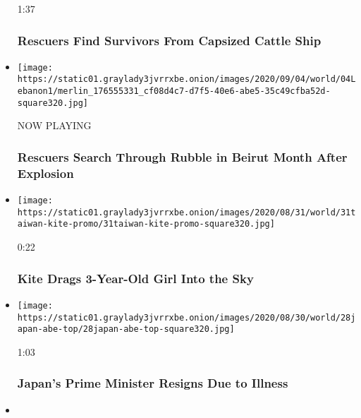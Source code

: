 \begin{itemize}
  1:37

  \hypertarget{rescuers-find-survivors-from-capsized-cattle-ship}{%
  \subsubsection{Rescuers Find Survivors From Capsized Cattle
  Ship}\label{rescuers-find-survivors-from-capsized-cattle-ship}}
\item
  \texttt{[image: https://static01.graylady3jvrrxbe.onion/images/2020/09/04/world/04Lebanon1/merlin\_176555331\_cf08d4c7-d7f5-40e6-abe5-35c49cfba52d-square320.jpg]}

  NOW PLAYING

  \hypertarget{rescuers-search-through-rubble-in-beirut-month-after-explosion-1}{%
  \subsubsection{Rescuers Search Through Rubble in Beirut Month After
  Explosion}\label{rescuers-search-through-rubble-in-beirut-month-after-explosion-1}}
\item
  \href{https://www.nytimes3xbfgragh.onion/video/world/asia/100000007316365/taiwan-kite-video.html?action=click\&module=video-series-bar\&region=header\&pgtype=Article\&playlistId=video/world}{}

  \texttt{[image: https://static01.graylady3jvrrxbe.onion/images/2020/08/31/world/31taiwan-kite-promo/31taiwan-kite-promo-square320.jpg]}

  0:22

  \hypertarget{kite-drags-3-year-old-girl-into-the-sky}{%
  \subsubsection{Kite Drags 3-Year-Old Girl Into the
  Sky}\label{kite-drags-3-year-old-girl-into-the-sky}}
\item
  \href{https://www.nytimes3xbfgragh.onion/video/us/100000007313110/japan-prime-minister-shinzo-abe-resigns-video.html?action=click\&module=video-series-bar\&region=header\&pgtype=Article\&playlistId=video/world}{}

  \texttt{[image: https://static01.graylady3jvrrxbe.onion/images/2020/08/30/world/28japan-abe-top/28japan-abe-top-square320.jpg]}

  1:03

  \hypertarget{japans-prime-minister-resigns-due-to-illness}{%
  \subsubsection{Japan's Prime Minister Resigns Due to
  Illness}\label{japans-prime-minister-resigns-due-to-illness}}
\item
  \href{https://www.nytimes3xbfgragh.onion/video/us/politics/100000007313169/greece-rescue-lost-girl-unicorn-floaty.html?action=click\&module=video-series-bar\&region=header\&pgtype=Article\&playlistId=video/world}{}


\end{itemize}
